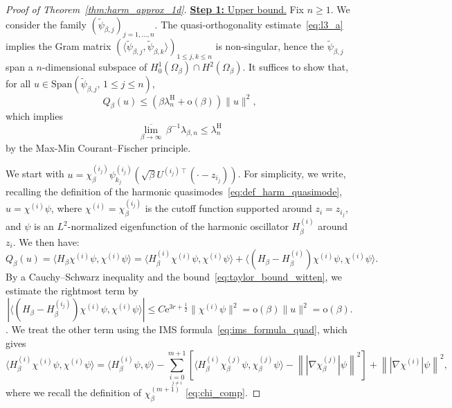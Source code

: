 \documentclass[10pt]{article}
\newcommand{\e}{\mathrm{e}}
\newcommand{\psitilde}{\widetilde\psi}
\newcommand{\1}{\mathbbm 1}
\renewcommand{\o}{\mathrm{o}}
\begin{document}
    \begin{proof}[Proof of Theorem~\ref{thm:harm_approx_1d}]

        {\underline{{\bf Step 1: }Upper bound.}\newline}
        Fix $n\geq 1$. We consider the family $(\psitilde_{\beta,j})_{j=1,\dots,n}$.
        The quasi-orthogonality estimate~\eqref{eq:l3_a} implies the Gram matrix $\left(\langle \psitilde_{\beta,j},\psitilde_{\beta,k}\rangle\right)_{1\leq j,k \leq n}$ is non-singular, hence the $\psitilde_{\beta,j}$ span a $n$-dimensional subspace of $H_0^1(\Omega_\beta)\cap H^2(\Omega_\beta)$.
        It suffices to show that, for all $u\in \mathrm{Span}(\psitilde_{\beta,j},\,1\leq j \leq n)$,
        $$Q_\beta(u) \leq (\beta\lambda_n^{\mathrm{H}}+\o(\beta))\|u\|^2,$$
        which implies
        \[\underset{\beta\to\infty}{\overline\lim}\,\beta^{-1}\lambda_{\beta,n} \leq \lambda_n^{\mathrm{H}}\]
        by the Max-Min Courant--Fischer principle.

        We start with $u=\chi_\beta^{(i_j)}\psi_{k_j}^{(i_j)}(\sqrt \beta U^{(i_j)\intercal}(\cdot-z_{i_j}))$. For simplicity, we write, recalling the definition of the harmonic quasimodes~\eqref{eq:def_harm_quasimode}, $u = \chi^{(i)}\psi$, where $\chi^{(i)}=\chi_\beta^{(i_j)}$ is the cutoff function supported around $z_i = z_{i_j}$, and $\psi$ is an $L^2$-normalized eigenfunction of the harmonic oscillator $H_\beta^{(i)}$ around $z_i$.
        We then have:
        $$Q_\beta(u) = \langle H_\beta\chi^{(i)}\psi,\chi^{(i)}\psi\rangle = \langle H_\beta^{(i)}\chi^{(i)}\psi,\chi^{(i)}\psi\rangle + \langle (H_\beta-H_\beta^{(i)})\chi^{(i)}\psi,\chi^{(i)}\psi\rangle.$$
        By a Cauchy--Schwarz inequality and the bound~\eqref{eq:taylor_bound_witten}, we estimate the rightmost term by
        $$\left|\langle (H_\beta-H_\beta^{(i_j)})\chi^{(i)}\psi,\chi^{(i)}\psi\rangle\right| \leq C\e^{3r+\frac12}\|\chi^{(i)}\psi\|^2 = \o(\beta)\|u\|^2 =\o(\beta).$$
        .
        We treat the other term using the IMS formula~\eqref{eq:ims_formula_quad}, which gives
        $$ \langle H_\beta^{(i)}\chi^{(i)}\psi,\chi^{(i)}\psi\rangle =  \langle H_\beta^{(i)}\psi,\psi\rangle - \sum_{\underset{j\neq i}{i=0}}^{m+1}\left[\langle H_\beta^{(i)}\chi_\beta^{(j)}\psi,\chi_\beta^{(j)}\psi\rangle - \left\| |\nabla\chi_\beta^{(j)}|\psi\right\|^2\right] + \left\| |\nabla\chi^{(i)}|\psi\right\|^2,$$
        where we recall the definition of $\chi_\beta^{(m+1)}$~\eqref{eq:chi_comp}.


\end{proof}
\end{document}
